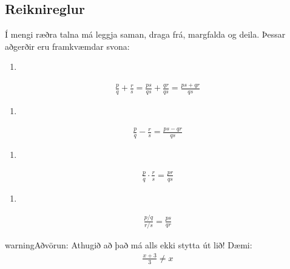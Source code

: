 \documentclass[a4paper,10pt,icelandic]{sphinxmanual}
\begin{document}
\subsection{Reiknireglur}
\label{\detokenize{Kafli01:id1}}
Í mengi ræðra talna má leggja saman, draga frá, margfalda og deila. Þessar aðgerðir eru framkvæmdar svona:
\begin{enumerate}
%
\item {} 
\end{enumerate}
\begin{equation*}
\begin{split}\frac{p}{q}+\frac{r}{s}=\frac{ps}{qs}+\frac{qr}{qs}=\frac{ps+qr}{qs}\end{split}
\end{equation*}\begin{enumerate}
%
\setcounter{enumi}{1}
\item {} 
\end{enumerate}
\begin{equation*}
\begin{split}\frac{p}{q}-\frac{r}{s}=\frac{ps-qr}{qs}\end{split}
\end{equation*}\begin{enumerate}
%
\setcounter{enumi}{2}
\item {} 
\end{enumerate}
\begin{equation*}
\begin{split}\frac{p}{q} \cdot \frac{r}{s}=\frac{pr}{qs}\end{split}
\end{equation*}\begin{enumerate}
%
\setcounter{enumi}{3}
\item {} 
\end{enumerate}
\begin{equation*}
\begin{split}\frac{p/q}{r/s} =\frac{ps}{qr}\end{split}
\end{equation*}
\begin{sphinxadmonition}{warning}{Aðvörun:}
Athugið að það má alls ekki stytta út lið! Dæmi:
\begin{equation*}
\begin{split}\frac{x+3}{3} \neq x\end{split}
\end{equation*}\end{sphinxadmonition}
\end{document}
